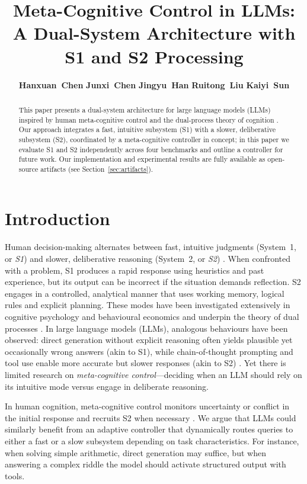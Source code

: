 \documentclass[11pt]{article}
\title{Meta-Cognitive Control in LLMs: A Dual-System Architecture with S1 and S2 Processing}
\author{
\textbf{Hanxuan~Chen} \quad
\textbf{Junxi~Chen} \quad
\textbf{Jingyu~Han} \quad
\textbf{Ruitong~Liu} \quad
\textbf{Kaiyi~Sun} \\
\vspace{0.5em}
}
\begin{document}
\maketitle

\begin{abstract}
This paper presents a dual-system architecture for large language models (LLMs)
inspired by human meta-cognitive control and the dual-process theory of
cognition \cite{kahneman2011thinking}.  Our approach integrates a fast,
intuitive subsystem (S1) with a slower, deliberative subsystem (S2),
coordinated by a meta-cognitive controller in concept; in this paper we evaluate S1 and S2 independently across four benchmarks and outline a controller for future work.  Our implementation and experimental results are fully
available as open-source artifacts (see Section~\ref{sec:artifacts}).
\end{abstract}

\section{Introduction}
Human decision-making alternates between fast, intuitive judgments (System~1, or
\textit{S1}) and slower, deliberative reasoning (System~2, or \textit{S2})
\cite{tversky1974judgment,kahneman2011thinking}.  When confronted with a
problem, S1 produces a rapid response using heuristics and past experience, but
its output can be incorrect if the situation demands reflection.  S2 engages
in a controlled, analytical manner that uses working memory, logical rules and
explicit planning.  These modes have been investigated extensively in
cognitive psychology and behavioural economics and underpin the theory of dual
processes \cite{stanovich2000individual}.  In large language models (LLMs),
analogous behaviours have been observed: direct generation without explicit
reasoning often yields plausible yet occasionally wrong answers (akin to S1),
while chain-of-thought prompting and tool use enable more accurate but slower
responses (akin to S2) \cite{wei2022chain}.  Yet there
is limited research on \emph{meta-cognitive control}—deciding when an LLM
should rely on its intuitive mode versus engage in deliberate reasoning.

In human cognition, meta-cognitive control monitors uncertainty or conflict in
the initial response and recruits S2 when necessary \cite{evans2003two}.  We
argue that LLMs could similarly benefit from an adaptive controller that
dynamically routes queries to either a fast or a slow subsystem depending on
task characteristics.  For instance, when solving simple arithmetic, direct
generation may suffice, but when answering a complex riddle the model should
activate structured output with tools.
\end{document}
